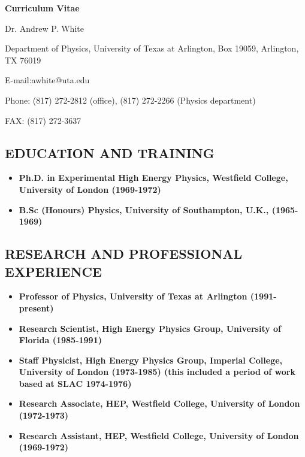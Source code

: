 \begin{center}

\textbf{Curriculum Vitae}

Dr. Andrew P. White

Department of Physics, University of Texas at Arlington, Box 19059, Arlington, TX 76019

E-mail:awhite@uta.edu

Phone: (817) 272-2812 (office), (817) 272-2266 (Physics department)

FAX: (817) 272-3637

\end{center}


\subsection{EDUCATION AND TRAINING}
\begin{itemize}
\item{
\textbf{Ph.D. in Experimental High Energy Physics, Westfield College, University of London (1969-1972) }
}

\item{
\textbf{B.Sc (Honours) Physics, University of  Southampton, U.K., (1965-1969) }
}
\end{itemize}
\subsection{RESEARCH AND PROFESSIONAL EXPERIENCE}
\begin{itemize}
\item{
\textbf{Professor of Physics,  University of Texas at Arlington (1991-present)}
}

\item{
\textbf{Research Scientist, High Energy Physics Group, University of Florida (1985-1991) } 
}

\item{
\textbf{Staff Physicist, High Energy Physics Group, Imperial College, University of London (1973-1985) 
(this included a period of work based at SLAC 1974-1976) }
} 

\item{
\textbf{Research Associate, HEP, Westfield College, University of London (1972-1973) } 
}

\item {
\textbf{Research Assistant, HEP, Westfield College, University of London (1969-1972) } 
}
\end{itemize}

